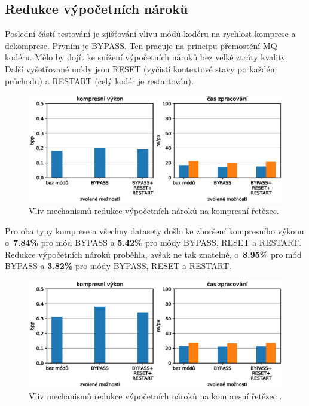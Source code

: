 %
%
\newpage
\subsection*{Redukce výpočetních nároků}
Poslední částí testování je zjišťování vlivu módů kodéru na rychlost komprese a dekomprese. Prvním je BYPASS. Ten pracuje na principu přemostění MQ kodéru. Mělo by dojít ke snížení výpočetních nároků bez velké ztráty kvality. Další vyšetřované módy jsou RESET (vyčistí kontextové stavy po každém průchodu) a RESTART (celý kodér je restartován).

\begin{figure}[hbt!]
  \centering
  \hspace*{-0.75cm}
  \includegraphics[width=16cm]{obrazky-figures/compute/test.eps}
  \caption{Vliv mechanismů redukce výpočetních nároků na kompresní řetězec.}
\end{figure}

Pro oba typy komprese a všechny datasety došlo ke zhoršení kompresního výkonu o~\textbf{7.84\%} pro mód BYPASS a \textbf{5.42\%} pro módy BYPASS, RESET a RESTART. Redukce výpočetních nároků proběhla, avšak ne tak znatelně, o~\textbf{8.95\%} pro mód BYPASS a \textbf{3.82\%} pro módy BYPASS, RESET a RESTART.

\begin{figure}[hbt!]
  \centering
  \hspace*{-0.75cm}
  \includegraphics[width=16cm]{obrazky-figures/compute/test2.eps}
  \caption{Vliv mechanismů redukce výpočetních nároků na kompresní řetězec .}
\end{figure}

